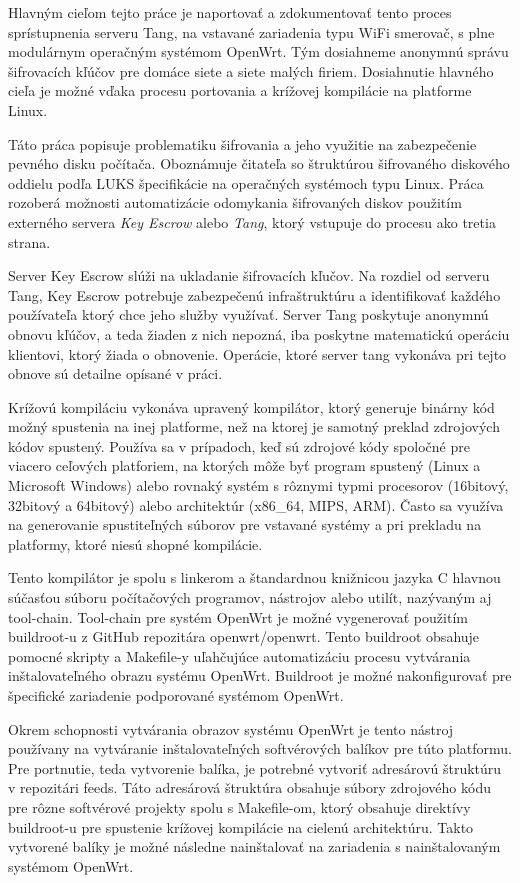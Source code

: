 Hlavným cieľom tejto práce je naportovať a zdokumentovať tento proces sprístupnenia serveru Tang, na vstavané zariadenia typu WiFi smerovač, s plne modulárnym operačným systémom OpenWrt.
Tým dosiahneme anonymnú správu šifrovacích kľúčov pre domáce siete a siete malých firiem.
Dosiahnutie hlavného cieľa je možné vďaka procesu portovania a krížovej kompilácie na platforme Linux.

Táto práca popisuje problematiku šifrovania a jeho využitie na zabezpečenie pevného disku počítača.
Oboznámuje čitateľa so štruktúrou šifrovaného diskového oddielu podľa LUKS špecifikácie na operačných systémoch typu Linux.
Práca rozoberá možnosti automatizácie odomykania šifrovaných diskov použitím externého servera {\it Key Escrow} alebo {\it Tang}, ktorý vstupuje do procesu ako tretia strana.

Server Key Escrow slúži na ukladanie šifrovacích kľučov.
Na rozdiel od serveru Tang, Key Escrow potrebuje zabezpečenú infraštruktúru a identifikovať každého používateľa ktorý chce jeho služby využívať.
Server Tang poskytuje anonymnú obnovu kľúčov, a teda žiaden z nich nepozná, iba poskytne matematickú operáciu klientovi, ktorý žiada o obnovenie.
Operácie, ktoré server tang vykonáva pri tejto obnove sú detailne opísané v práci.

Krížovú kompiláciu vykonáva upravený kompilátor, ktorý generuje binárny kód možný spustenia na inej platforme, než na ktorej je samotný preklad zdrojových kódov spustený.
Používa sa v prípadoch, keď sú zdrojové kódy spoločné pre viacero ceľových platforiem, na ktorých môže byť program spustený (Linux a Microsoft Windows) alebo rovnaký systém s rôznymi typmi procesorov (16bitový, 32bitový a 64bitový) alebo architektúr (x86\_64, MIPS, ARM).
Často sa využíva na generovanie spustiteľných súborov pre vstavané systémy a pri prekladu na platformy, ktoré niesú shopné kompilácie.

Tento kompilátor je spolu s linkerom a štandardnou knižnicou jazyka C hlavnou súčasťou súboru počítačových programov, nástrojov alebo utilít, nazývaným aj tool-chain.
Tool-chain pre systém OpenWrt je možné vygenerovať použitím buildroot-u z GitHub repozitára openwrt/openwrt.
Tento buildroot obsahuje pomocné skripty a Makefile-y uľahčujúce automatizáciu procesu vytvárania inštalovateľného obrazu systému OpenWrt.
Buildroot je možné nakonfigurovať pre špecifické zariadenie podporované systémom OpenWrt.

Okrem schopnosti vytvárania obrazov systému OpenWrt je tento nástroj používany na vytváranie inštalovateľných softvérových balíkov pre túto platformu.
Pre portnutie, teda vytvorenie balíka, je potrebné vytvoriť adresárovú štruktúru v repozitári feeds.
Táto adresárová štruktúra obsahuje súbory zdrojového kódu pre rôzne softvérové projekty spolu s Makefile-om, ktorý obsahuje direktívy buildroot-u pre spustenie krížovej kompilácie na cielenú architektúru.
Takto vytvorené balíky je možné následne nainštalovať na zariadenia s nainštalovaným systémom OpenWrt.

